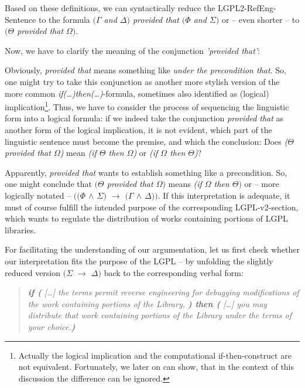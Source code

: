 Based on these definitions, we can syntactically reduce the
LGPL2-RefEng-Sentence to the formula \emph{$(\Gamma$ and $\Delta)$ provided that
$(\Phi$ and $\Sigma)$} or -- even shorter -- to \emph{$(\Theta$ provided that
$\Omega)$}.

Now, we have to clarify the meaning of the conjunction \emph{'provided that'}:

Obviously, \emph{provided that} means something like \emph{under the
precondition that}. So, one might try to take this conjunction as another more
stylish version of the more common \emph{if(\ldots)then(\ldots)}-formula,
sometimes also identified as (logical) implication\footnote{Actually the logical
implication and the computational if-then-construct are not equivalent.
Fortunately, we later on can show, that in the context of this discussion the
difference can be ignored.}. Thus, we have to consider the process of sequencing
the linguistic form into a logical formula: if we indeed take the conjunction
\emph{provided that} as another form of the logical implication, it is not
evident, which part of the linguistic sentence must become the premise, and
which the conclusion: Does \emph{($\Theta$ provided that $\Omega$)} mean
\emph{(if $\Theta$ then $\Omega$)} or \emph{(if $\Omega$ then $\Theta$)}?

Apparently, \emph{provided that} wants to establish something like a
precondition. So, one might conclude that \emph{$(\Theta$ provided that
$\Omega)$} means \emph{(if $\Omega$ then $\Theta)$} or -- more logically notated
-- \emph{$((\Phi$ $\wedge$ $\Sigma)$ $\rightarrow$ $(\Gamma$ $\wedge$
$\Delta))$}. If this interpretation is adequate, it must of course fulfill the
intended purpose of the corresponding LGPL-v2-section, which wants to regulate
the distribution of works containing portions of LGPL libraries.

For facilitating the understanding of our argumentation, let us first check
whether our interpretation fits the purpose of the LGPL -- by unfolding the
slightly reduced version \emph{$(\Sigma$ $\rightarrow$ $\Delta)$} back to the
corresponding verbal form:

\begin{quote}\noindent\emph{\textbf{if (} [\ldots] the terms permit reverse
engineering for debugging modifications of the work containing portions of the
Library, \textbf{) then (} [\ldots] you may distribute that work containing
portions of the Library under the terms of your choice.\textbf{)}}\end{quote}

